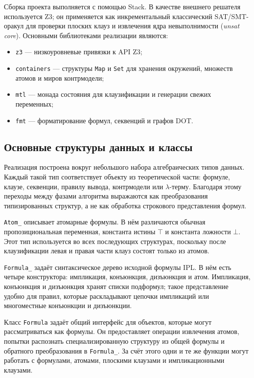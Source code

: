 \documentclass[14pt, russian]{scrartcl}
\begin{document}
Сборка проекта выполняется с помощью Stack. В качестве внешнего решателя
используется Z3; он применяется как инкрементальный классический SAT/SMT-оракул
для проверки плоских клауз и извлечения ядра невыполнимости
(\emph{unsat core}). Основными библиотеками реализации являются:
\begin{itemize}
\item \texttt{z3} --- низкоуровневые привязки к API Z3;
\item \texttt{containers} --- структуры \texttt{Map} и \texttt{Set} для
  хранения окружений, множеств атомов и миров контрмодели;
\item \texttt{mtl} --- монада состояния для клаузификации и генерации свежих
  переменных;
\item \texttt{fmt} --- форматирование формул, секвенций и графов DOT.
\end{itemize}

\subsection{Основные структуры данных и классы}

Реализация построена вокруг небольшого набора алгебраических типов данных.
Каждый такой тип соответствует объекту из теоретической части: формуле, клаузе,
секвенции, правилу вывода, контрмодели или $\lambda$-терму. Благодаря этому
переходы между фазами алгоритма выражаются как преобразования типизированных
структур, а не как обработка строкового представления формул.

\texttt{Atom\_} описывает атомарные формулы. В нём различаются обычная
пропозициональная переменная, константа истины $\top$ и константа ложности
$\bot$. Этот тип используется во всех последующих структурах, поскольку после
клаузификации левая и правая части клауз состоят только из атомов.

\texttt{Formula\_} задаёт синтаксическое дерево исходной формулы IPL. В нём
есть четыре конструктора: импликация, конъюнкция, дизъюнкция и атом.
Импликация, конъюнкция и дизъюнкция хранят списки подформул; такое
представление удобно для правил, которые раскладывают цепочки импликаций или
многоместные конъюнкции и дизъюнкции.

Класс \texttt{Formula} задаёт общий интерфейс для объектов, которые могут
рассматриваться как формулы. Он предоставляет операции извлечения атомов,
попытки распознать специализированную структуру из общей формулы и обратного
преобразования в \texttt{Formula\_}. За счёт этого одни и те же функции могут
работать с формулами, атомами, плоскими клаузами и импликационными клауза\-ми.
\end{document}
